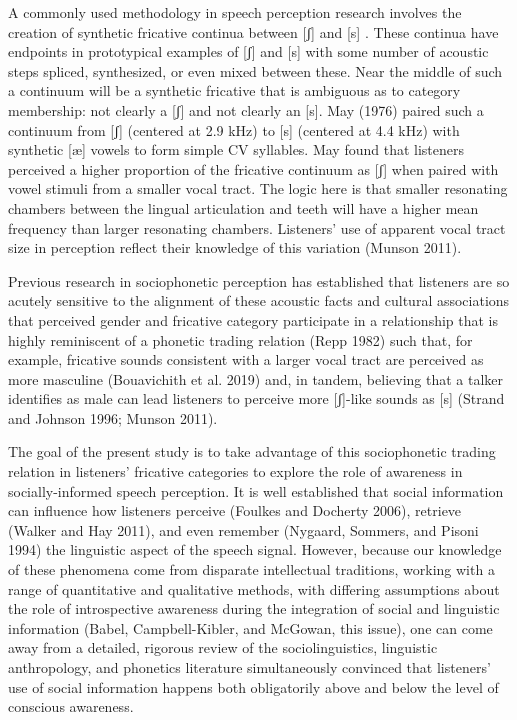 \documentclass[
  letterpaper,
  DIV=11,
  numbers=noendperiod]{scrartcl}
\begin{document}
A commonly used methodology in speech perception research involves the
creation of synthetic fricative continua between {[}ʃ{]} and {[}s{]} .
These continua have endpoints in prototypical examples of {[}ʃ{]} and
{[}s{]} with some number of acoustic steps spliced, synthesized, or even
mixed between these. Near the middle of such a continuum will be a
synthetic fricative that is ambiguous as to category membership: not
clearly a {[}ʃ{]} and not clearly an {[}s{]}. May (1976) paired such a
continuum from {[}ʃ{]} (centered at 2.9 kHz) to {[}s{]} (centered at 4.4
kHz) with synthetic {[}æ{]} vowels to form simple CV syllables. May
found that listeners perceived a higher proportion of the fricative
continuum as {[}ʃ{]} when paired with vowel stimuli from a smaller vocal
tract. The logic here is that smaller resonating chambers between the
lingual articulation and teeth will have a higher mean frequency than
larger resonating chambers. Listeners' use of apparent vocal tract size
in perception reflect their knowledge of this variation (Munson 2011).

Previous research in sociophonetic perception has established that
listeners are so acutely sensitive to the alignment of these acoustic
facts and cultural associations that perceived gender and fricative
category participate in a relationship that is highly reminiscent of a
phonetic trading relation (Repp 1982) such that, for example, fricative
sounds consistent with a larger vocal tract are perceived as more
masculine (Bouavichith et al. 2019) and, in tandem, believing that a
talker identifies as male can lead listeners to perceive more
{[}ʃ{]}-like sounds as {[}s{]} (Strand and Johnson 1996; Munson 2011).

The goal of the present study is to take advantage of this sociophonetic
trading relation in listeners' fricative categories to explore the role
of awareness in socially-informed speech perception. It is well
established that social information can influence how listeners perceive
(Foulkes and Docherty 2006), retrieve (Walker and Hay 2011), and even
remember (Nygaard, Sommers, and Pisoni 1994) the linguistic aspect of
the speech signal. However, because our knowledge of these phenomena
come from disparate intellectual traditions, working with a range of
quantitative and qualitative methods, with differing assumptions about
the role of introspective awareness during the integration of social and
linguistic information (Babel, Campbell-Kibler, and McGowan, this
issue), one can come away from a detailed, rigorous review of the
sociolinguistics, linguistic anthropology, and phonetics literature
simultaneously convinced that listeners' use of social information
happens both obligatorily above and below the level of conscious
awareness.
\end{document}
